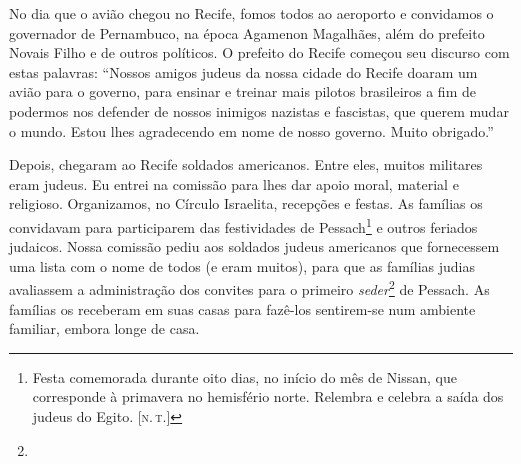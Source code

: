 No dia que o avião chegou no Recife, fomos todos ao aeroporto e
convidamos o governador de Pernambuco, na época Agamenon Magalhães, além do
prefeito Novais Filho e de outros políticos. O prefeito do
Recife começou seu discurso com estas palavras: ``Nossos amigos judeus
da nossa cidade do Recife doaram um avião para o governo, para
ensinar e treinar mais pilotos brasileiros a fim de podermos nos defender
de nossos inimigos nazistas e fascistas, que querem mudar o
mundo. Estou lhes agradecendo em nome de nosso governo. Muito obrigado.''




Depois, chegaram ao Recife soldados americanos. Entre eles, muitos
militares eram judeus. Eu entrei na comissão para lhes dar apoio moral,
material e religioso. Organizamos, no Círculo Israelita,
recepções e festas. As famílias os convidavam para
participarem das festividades de Pessach\footnote{Festa
  comemorada durante oito dias, no início do mês de Nissan, que
  corresponde à primavera no hemisfério norte. Relembra e celebra a
  saída dos judeus do Egito. {[}\textsc{n.\,t.}{]}} e outros feriados judaicos. Nossa comissão
pediu aos soldados judeus americanos que fornecessem uma lista com o
nome de todos (e eram muitos), para que as famílias
judias avaliassem a administração dos convites para o primeiro
\textit{seder}\footnote{} de Pessach. As famílias os receberam em suas casas para fazê-los sentirem-se num ambiente familiar, embora longe de casa.

